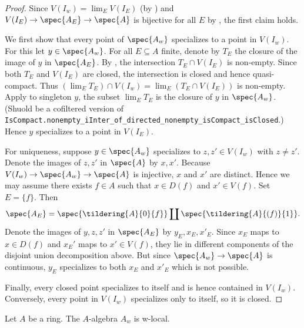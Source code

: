 \begin{proof}
    Since $V(I_w) = \lim_{E} V(I_E)$ (by ) and $V(I_E) \to \spec{A_E} \to \spec{A}$ is
    bijective for all $E$ by , the
    first claim holds.

    We first show that every point of $\spec{A_w}$ specializes to a point in $V(I_w)$.
    For this let $y \in \spec{A_w}$. For all $E \subseteq A$ finite, denote by
    $T_E$ the closure of the image of $y$ in $\spec{A_E}$. By
    , the intersection $T_E \cap V(I_E)$ is
    non-empty. Since both $T_E$ and $V(I_E)$ are closed, the intersection is closed
    and hence quasi-compact. Thus $(\lim_E T_E) \cap V(I_w) = \lim_E (T_E \cap V(I_E))$ is non-empty.
    Apply  to singleton \({y}\), the subset $\lim_E T_E$ is the closure of $y$ in $\spec{A_w}$. (Shuold be a cofiltered version of \verb`IsCompact.nonempty_iInter_of_directed_nonempty_isCompact_isClosed`.) Hence
    $y$ specializes to a point in $V(I_E)$.

    For uniqueness, suppose $y \in \spec{A_w}$ specializes to $z, z' \in V(I_w)$ with
    $z \neq z'$. Denote the images of $z, z'$ in $\spec{A}$ by $x, x'$.
    Because $V(I_w) \to \spec{A_w} \to \spec{A}$ is injective, $x$ and $x'$ are distinct. Hence we may
    assume there exists $f \in A$ such that $x \in D(f)$ and $x' \in V(f)$. Set
    $E = \{f\}$. Then
    \[
        \spec{A_E} = \spec{\tildering{A}{0}{f}} \coprod \spec{\tildering{A}{(f)}{1}}
    .\]
    Denote the images of $y, z, z'$ in $\spec{A_E}$ by $y_E, x_E, x'_E$. Since
    $x_E$ maps to $x \in D(f)$ and $x_E'$ maps to $x' \in V(f)$, they lie
    in different components of the disjoint union decomposition above. But
    since $\spec{A_w} \to \spec{A}$ is continuous, $y_E$ specializes to both $x_E$ and $x'_E$
    which is not possible.

    Finally, every closed point specializes to itself and is hence contained in $V(I_{w})$. Conversely,
    every point in $V(I_{w})$ specializes only to itself, so it is closed.
\end{proof}

\begin{corollary}
    Let $A$ be a ring. The $A$-algebra $A_w$ is w-local.
    \label{cor:w-localization-w-local}
    \leanok
\end{corollary}

